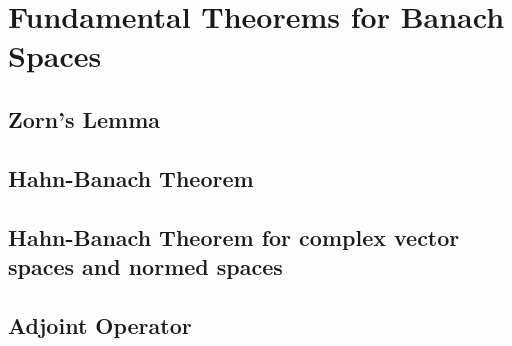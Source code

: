 \section{Fundamental Theorems for Banach Spaces}
\subsection{Zorn's Lemma}
\subsection{Hahn-Banach Theorem}
\subsection{Hahn-Banach Theorem for complex vector spaces and normed spaces}
\setcounter{subsection}{4}
\subsection{Adjoint Operator}

